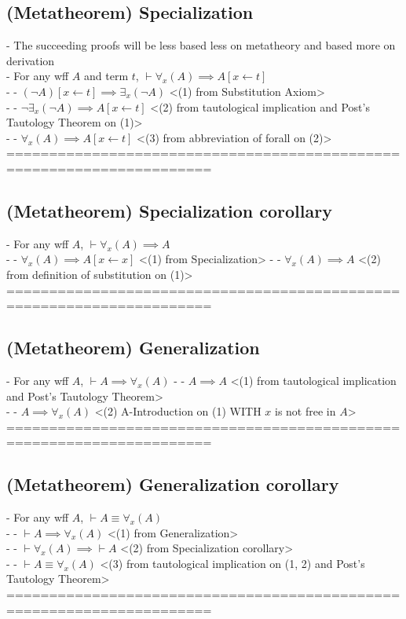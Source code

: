 \documentclass{article}
\begin{document}
\subsection{(Metatheorem) Specialization}
	- The succeeding proofs will be less based less on metatheory and based more on derivation \\
	- For any wff $A$ and term $t$, $\vdash \forall_x(A) \implies A[x \leftarrow t]$ \\
		- - $(\lnot A)[x \leftarrow t] \implies \exists_x(\lnot A)$ <(1) from Substitution Axiom> \\
		- - $\lnot \exists_x(\lnot A) \implies A[x \leftarrow t]$ <(2) from tautological implication and Post's Tautology Theorem on (1)> \\
		- - $\forall_x(A) \implies A[x \leftarrow t]$ <(3) from abbreviation of forall on (2)> \\
	======================================================================
\subsection{(Metatheorem) Specialization corollary}
	- For any wff $A$, $\vdash \forall_x(A) \implies A$ \\
		- - $\forall_x(A) \implies A[x \leftarrow x]$ <(1) from Specialization>
		- - $\forall_x(A) \implies A$ <(2) from definition of substitution on (1)>
	======================================================================
\subsection{(Metatheorem) Generalization}
	- For any wff $A$, $\vdash A \implies \forall_x(A)$
		- - $A \implies A$ <(1) from tautological implication and Post's Tautology Theorem> \\
		- - $A \implies \forall_x(A)$ <(2) A-Introduction on (1) WITH $x$ is not free in $A$> \\
	======================================================================
\subsection{(Metatheorem) Generalization corollary}
	- For any wff $A$, $\vdash A \equiv \forall_x(A)$ \\
		- - $\vdash A \implies \forall_x(A)$ <(1) from Generalization> \\
		- - $\vdash \forall_x(A) \implies \vdash A$ <(2) from Specialization corollary> \\
		- - $\vdash A \equiv \forall_x(A)$ <(3) from tautological implication on (1, 2) and Post's Tautology Theorem> \\
	======================================================================
\end{document}
